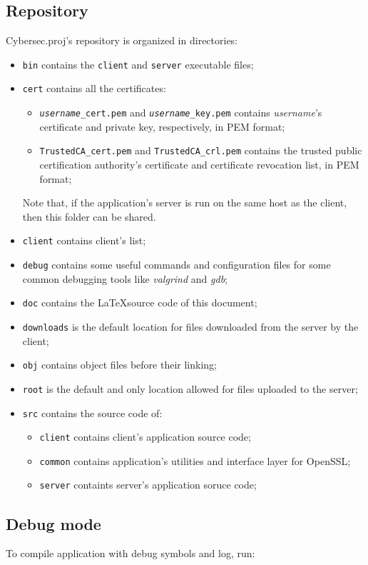 \documentclass[a4paper,12pt]{article}
\newcommand{\projectname}{Cybersec.proj}
\begin{document}
\subsection{Repository}
\projectname{}'s repository is organized in directories:
\begin{itemize}
  \item \texttt{bin} contains the \texttt{client} and \texttt{server} executable files;
  \item \texttt{cert} contains all the certificates:
  \begin{itemize}
    \item \texttt{\emph{username}\_cert.pem} and \texttt{\emph{username}\_key.pem} contains \emph{username}'s certificate and private key, respectively, in PEM format;
    \item \texttt{TrustedCA\_cert.pem} and \texttt{TrustedCA\_crl.pem} contains the trusted public certification authority's certificate and certificate revocation list, in PEM format;
  \end{itemize}
  Note that, if the application's server is run on the same host as the client, then this folder can be shared.
  \item \texttt{client} contains client's list;
  \item \texttt{debug} contains some useful commands and configuration files for some common debugging tools like \emph{valgrind} and \emph{gdb};
  \item \texttt{doc} contains the \LaTeX source code of this document;
  \item \texttt{downloads} is the default location for files downloaded from the server by the client;
  \item \texttt{obj} contains object files before their linking;
  \item \texttt{root} is the default and only location allowed for files uploaded to the server;
  \item \texttt{src} contains the source code of:
  \begin{itemize}
    \item \texttt{client} contains client's application source code;
    \item \texttt{common} contains application's utilities and interface layer for OpenSSL;
    \item \texttt{server} containts server's application soruce code;
  \end{itemize}
\end{itemize}

\subsection{Debug mode}
To compile application with debug symbols and log, run:
\end{document}
